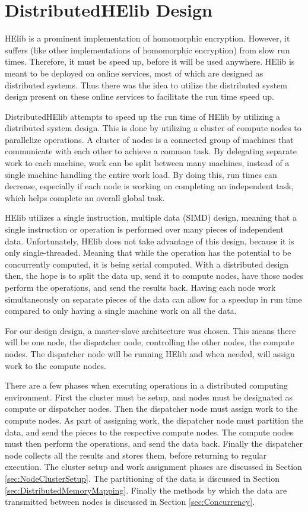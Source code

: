 \chapter{DistributedHElib Design} \label{chap:DistributedHElibDesign}
HElib is a prominent implementation of homomorphic encryption. However, it suffers (like other implementations of homomorphic encryption) from slow run times. Therefore, it must be speed up, before it will be used anywhere. HElib is meant to be deployed on online services, most of which are designed as distributed systems. Thus there was the idea to utilize the distributed system design present on these online services to facilitate the run time speed up.

DistributedHElib attempts to speed up the run time of HElib by utilizing a distributed system design. This is done by utilizing a cluster of compute nodes to parallelize operations. A cluster of nodes is a connected group of machines that communicate with each other to achieve a common task. By delegating separate work to each machine, work can be split between many machines, instead of a single machine handling the entire work load. By doing this, run times can decrease, especially if each node is working on completing an independent task, which helps complete an overall global task. 

HElib utilizes a single instruction, multiple data (SIMD) design, meaning that a single instruction or operation is performed over many pieces of independent data. Unfortunately, HElib does not take advantage of this design, because it is only single-threaded. Meaning that while the operation has the potential to be concurrently computed, it is being serial computed. With a distributed design then, the hope is to split the data up, send it to compute nodes, have those nodes perform the operations, and send the results back. Having each node work simultaneously on separate pieces of the data can allow for a speedup in run time compared to only having a single machine work on all the data.

For our design design, a master-slave architecture was chosen. This means there will be one node, the dispatcher node, controlling the other nodes, the compute nodes. The dispatcher node will be running HElib and when needed, will assign work to the compute nodes. 

There are a few phases when executing operations in a distributed computing environment. First the cluster must be setup, and nodes must be designated as compute or dispatcher nodes. Then the dispatcher node must assign work to the compute nodes. As part of assigning work, the dispatcher node must partition the data, and send the pieces to the respective compute nodes. The compute nodes must then perform the operations, and send the data back. Finally the dispatcher node collects all the results and stores them, before returning to regular execution. The cluster setup and work assignment phases are discussed in Section \ref{sec:NodeClusterSetup}. The partitioning of the data is discussed in Section \ref{sec:DistributedMemoryMapping}. Finally the methods by which the data are transmitted between nodes is discussed in Section \ref{sec:Concurrency}.
 
